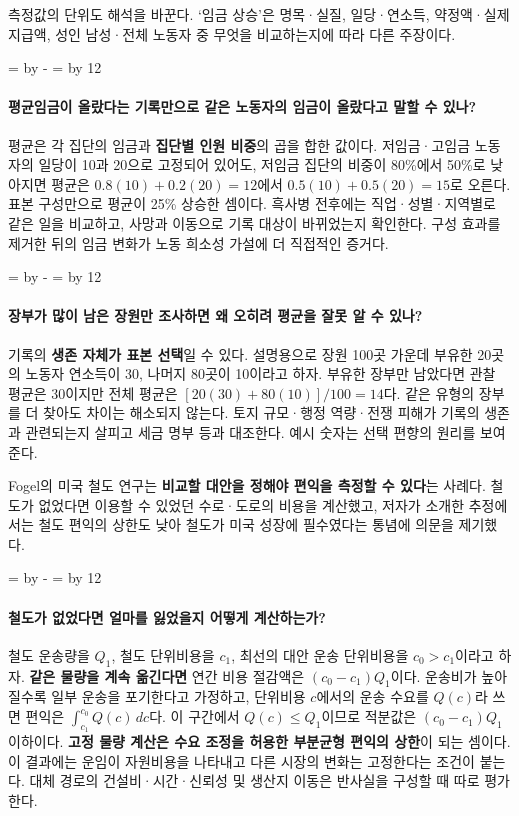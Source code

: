 \documentclass[10pt,a4paper]{article}
\newcommand{\ReserveQuestionSpace}{%
  \par\begingroup
  \dimen0=\pagegoal \advance\dimen0 by -\pagetotal
  \dimen2=\baselineskip \multiply\dimen2 by 12
  \ifdim\dimen0<\dimen2 \newpage\fi
  \endgroup}
\begin{document}
측정값의 단위도 해석을 바꾼다. ‘임금 상승’은 명목·실질, 일당·연소득, 약정액·실제 지급액, 성인 남성·전체 노동자 중 무엇을 비교하는지에 따라 다른 주장이다.\par

\ReserveQuestionSpace
\paragraph{평균임금이 올랐다는 기록만으로 같은 노동자의 임금이 올랐다고 말할 수 있나?}
평균은 각 집단의 임금과 \textbf{집단별 인원 비중}의 곱을 합한 값이다. 저임금·고임금 노동자의 일당이 10과 20으로 고정되어 있어도, 저임금 집단의 비중이 80\%에서 50\%로 낮아지면 평균은 $0.8(10)+0.2(20)=12$에서 $0.5(10)+0.5(20)=15$로 오른다. 표본 구성만으로 평균이 25\% 상승한 셈이다. 흑사병 전후에는 직업·성별·지역별로 같은 일을 비교하고, 사망과 이동으로 기록 대상이 바뀌었는지 확인한다. 구성 효과를 제거한 뒤의 임금 변화가 노동 희소성 가설에 더 직접적인 증거다.\par

\ReserveQuestionSpace
\paragraph{장부가 많이 남은 장원만 조사하면 왜 오히려 평균을 잘못 알 수 있나?}
기록의 \textbf{생존 자체가 표본 선택}일 수 있다. 설명용으로 장원 100곳 가운데 부유한 20곳의 노동자 연소득이 30, 나머지 80곳이 10이라고 하자. 부유한 장부만 남았다면 관찰 평균은 30이지만 전체 평균은 $[20(30)+80(10)]/100=14$다. 같은 유형의 장부를 더 찾아도 차이는 해소되지 않는다. 토지 규모·행정 역량·전쟁 피해가 기록의 생존과 관련되는지 살피고 세금 명부 등과 대조한다. 예시 숫자는 선택 편향의 원리를 보여 준다.\par

Fogel의 미국 철도 연구는 \textbf{비교할 대안을 정해야 편익을 측정할 수 있다}는 사례다. 철도가 없었다면 이용할 수 있었던 수로·도로의 비용을 계산했고, 저자가 소개한 추정에서는 철도 편익의 상한도 낮아 철도가 미국 성장에 필수였다는 통념에 의문을 제기했다.\par

\ReserveQuestionSpace
\paragraph{철도가 없었다면 얼마를 잃었을지 어떻게 계산하는가?}
철도 운송량을 $Q_1$, 철도 단위비용을 $c_1$, 최선의 대안 운송 단위비용을 $c_0>c_1$이라고 하자. \textbf{같은 물량을 계속 옮긴다면} 연간 비용 절감액은 $(c_0-c_1)Q_1$이다. 운송비가 높아질수록 일부 운송을 포기한다고 가정하고, 단위비용 $c$에서의 운송 수요를 $Q(c)$라 쓰면 편익은 $\int_{c_1}^{c_0}Q(c)\,dc$다. 이 구간에서 $Q(c)\leq Q_1$이므로 적분값은 $(c_0-c_1)Q_1$ 이하이다. \textbf{고정 물량 계산은 수요 조정을 허용한 부분균형 편익의 상한}이 되는 셈이다. 이 결과에는 운임이 자원비용을 나타내고 다른 시장의 변화는 고정한다는 조건이 붙는다. 대체 경로의 건설비·시간·신뢰성 및 생산지 이동은 반사실을 구성할 때 따로 평가한다.\par
\end{document}

